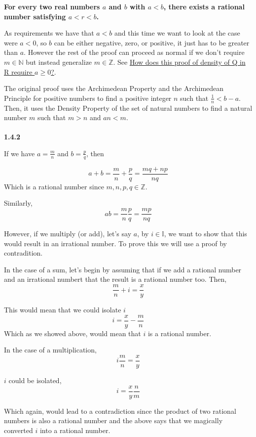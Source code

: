 \textbf{For every two real numbers $a$ and $b$ with $a<b$, there exists a rational number satisfying $a < r < b$.}

As requirements we have that $a<b$ and this time we want to look at the case were $a<0$,
so $b$ can be either negative, zero, or positive, it just has to be greater than $a$.
However the rest of the proof can proceed as normal if we don't require $m \in \mathbb{N}$ but
instead generalize $m \in \mathbb{Z}$.
See
\href{https://math.stackexchange.com/questions/48537/how-does-this-proof-of-density-of-mathbbq-in-mathbbr-require-a-geq-0}{How does this proof of density of Q in R require $a\geq 0$?}.

The original proof uses the Archimedean Property and the Archimedean Principle for positive
numbers to find a positive integer $n$ such that $\frac{1}{n} < b - a$.
Then, it uses the Density Property of the set of natural numbers to find a natural number $m$
such that $m > n$ and $an < m$.
\\~\\



\textbf{1.4.2}

If we have $a = \frac{m}{n}$ and $b = \frac{p}{q}$, then

$$
a + b = \frac{m}{n} + \frac{p}{q}
    = \frac{mq + np}{nq}
$$
Which is a rational number since $m, n, p, q \in \mathbb{Z}$.

Similarly,
$$
ab = \frac{m}{n} \frac{p}{q}
    = \frac{mp}{nq}
$$

However, if we multiply (or add), let's say $a$, by $i \in \mathbb{I}$, we want to show that this would result in an irrational number.
To prove this we will use a proof by contradition.

In the case of a sum, let's begin by assuming that if we add a rational number and an irrational numbert
that the result is a rational number too.
Then,
$$
\frac{m}{n} + i = \frac{x}{y}
$$

This would mean that we could isolate $i$
$$
i = \frac{x}{y} - \frac{m}{n}
$$
Which as we showed above, would mean that $i$ is a rational number.

In the case of a multiplication,
$$
i \frac{m}{n} = \frac{x}{y}
$$

$i$ could be isolated,
$$
i = \frac{x}{y} \frac{n}{m}
$$

Which again, would lead to a contradiction since the product of two rational numbers is also a rational number
and the above says that we magically converted $i$ into a rational number.

